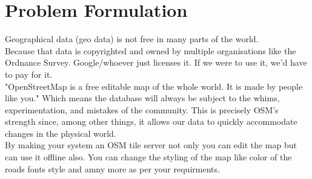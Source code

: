 \section{Problem Formulation}
Geographical data (geo data) is not free in many parts of the world.\\
Because that data is copyrighted and owned by multiple organisations like the Ordnance Survey. Google/whoever just licenses it. If we were to use it, we'd have to pay for it. \\
\noindent "OpenStreetMap is a free editable map of the whole world. It is made by people like you." Which means the database will always be subject to the whims, experimentation, and mistakes of the community. This is precisely OSM's strength since, among other things, it allows our data to quickly accommodate changes in the physical world.\\
\noindent By making your system an OSM tile server not only you can edit the map but can use it offline also. You can change the styling of the map like color of the roads fonts style and amny more as per your requirments. 

